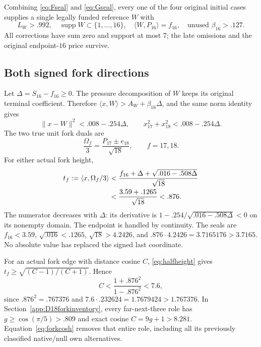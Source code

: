 \documentclass[11pt]{article}
\theoremstyle{definition}
\theoremstyle{remark}
\newcommand{\ip}[2]{\langle #1,#2\rangle}
\newcommand{\norm}[1]{\lVert #1\rVert}
\begin{document}
Combining \eqref{eq:Fseal} and \eqref{eq:Gseal}, every one of
the four original initial cases supplies a single legally
funded reference \(W\) with
\begin{equation}
\label{eq:uniformcontract}
 L_W>.992,\quad
 \operatorname{supp}W\subset\{1,\ldots,16\},\quad
 \ip{W}{P_{16}}=f_{16},\quad
 \text{unused }\beta_{16}>.127.
\end{equation}
All corrections have sum zero and support at most \(7\);
the late omissions and the original endpoint-\(16\) price survive.

\subsection{Both signed fork directions}
\label{subsec:forkheight}
Let \(\Delta=S_{16}-f_{16}\geq0\). The pressure decomposition
of \(W\) keeps its original terminal coefficient. Therefore
\(\ip{x}{W}>A_W+\beta_{16}\Delta\), and the same norm identity
gives
\begin{equation}
\label{eq:slack}
 \norm{x-W}^2<.008-.254\Delta,\qquad
 x_{17}^2+x_{18}^2<.008-.254\Delta.
\end{equation}
The two true unit fork duals are
\[
 \frac{\Omega_f}{3}
   =\frac{P_{17}\pm e_{18}}{\sqrt{18}},
 \qquad f=17,18.
\]
For either actual fork height,
\begin{align}
\label{eq:truefork}
 t_f:=\ip{x}{\Omega_f/3}
 &<\frac{f_{16}+\Delta+\sqrt{.016-.508\Delta}}{\sqrt{18}}\notag\\
 &<\frac{3.59+.1265}{\sqrt{18}}<.876.
\end{align}
The numerator decreases with \(\Delta\): its derivative is
\(1-.254/\sqrt{.016-.508\Delta}<0\) on its nonempty domain.
The endpoint is handled by continuity. The seals are
\(f_{16}<3.59\), \(\sqrt{.016}<.1265\),
\(\sqrt{18}>4.2426\), and
\(.876\cdot4.2426=3.7165176>3.7165\).
No absolute value has replaced the signed last coordinate.

For an actual fork edge with distance cosine \(C\),
\eqref{eq:halfheight} gives
\(t_f\geq\sqrt{(C-1)/(C+1)}\). Hence
\begin{equation}
\label{eq:forkcosh}
 C<\frac{1+.876^2}{1-.876^2}<7.6,
\end{equation}
since \(.876^2=.767376\) and
\(7.6\cdot.232624=1.7679424>1.767376\).
In Section~\ref{app:D18forkinventory}, every far-next-three
role has \(g\geq\cos(\pi/5)>.809\) and exact cosine
\(C=9g+1>8.281\). Equation~\eqref{eq:forkcosh} removes that
entire role, including all its previously classified native/null
own alternatives.
\end{document}
